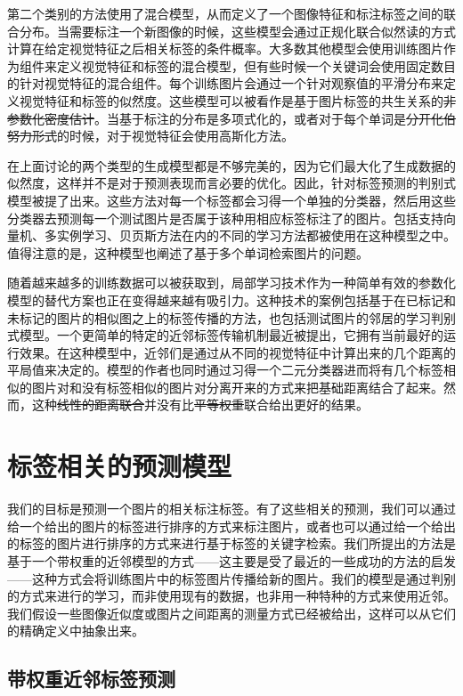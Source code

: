 \documentclass[a4paper,twocolumn]{ctexart}
\begin{document}
第二个类别的方法使用了混合模型，从而定义了一个图像特征和标注标签之间的联合分布。当需要标注一个新图像的时候，这些模型会通过正规化联合似然读的方式计算在给定视觉特征之后相关标签的条件概率。大多数其他模型会使用训练图片作为组件来定义视觉特征和标签的混合模型\cite{5,11,13}，但有些时候一个关键词会使用固定数目的针对视觉特征的混合组件\cite{2}。每个训练图片会通过一个针对观察值的平滑分布来定义视觉特征和标签的似然度。这些模型可以被看作是基于图片标签的共生关系的\sout{非参数化密度估计}。当基于标注的分布是多项式化的，或者对于每个单词是\sout{分开化伯努力形式}的时候，对于视觉特征会使用高斯化方法。

在上面讨论的两个类型的生成模型都是不够完美的，因为它们最大化了生成数据的似然度，这样并不是对于预测表现而言必要的优化。因此，针对标签预测的判别式模型被提了出来\cite{3,7,10}。这些方法对每一个标签都会习得一个单独的分类器，然后用这些分类器去预测每一个测试图片是否属于该种用相应标签标注了的图片。包括支持向量机、多实例学习、贝页斯方法在内的不同的学习方法都被使用在这种模型之中。值得注意的是，这种模型也阐述了基于多个单词检索图片的问题\cite{7}。

随着越来越多的训练数据可以被获取到，局部学习技术作为一种简单有效的参数化模型的替代方案也正在变得越来越有吸引力。这种技术的案例包括基于在已标记和未标记的图片的相似图之上的标签传播的方法\cite{16,22}，也包括测试图片的邻居的学习判别式模型\cite{27}。一个更简单的特定的近邻标签传输机制最近被提出，它拥有当前最好的运行效果。在这种模型中，近邻们是通过从不同的视觉特征中计算出来的几个距离的平局值来决定的。模型的作者也同时通过习得一个二元分类器进而将有几个标签相似的图片对和没有标签相似的图片对分离开来的方式来把基础距离结合了起来。然而，这种\sout{线性的距离联合}并没有比\sout{平等权重}联合给出更好的结果。

\section{标签相关的预测模型}

我们的目标是预测一个图片的相关标注标签。有了这些相关的预测，我们可以通过给一个给出的图片的标签进行排序的方式来标注图片，或者也可以通过给一个给出的标签的图片进行排序的方式来进行基于标签的关键字检索。我们所提出的方法是基于一个带权重的近邻模型的方式——这主要是受了最近的一些成功的方法的启发\cite{5,11,13,17}——这种方式会将训练图片中的标签图片传播给新的图片。我们的模型是通过判别的方式来进行的学习，而非使用现有的数据\cite{5}，也非用一种特种的方式来使用近邻\cite{17}。我们假设一些图像近似度或图片之间距离的测量方式已经被给出，这样可以从它们的精确定义中抽象出来。

\subsection{带权重近邻标签预测}
\end{document}
